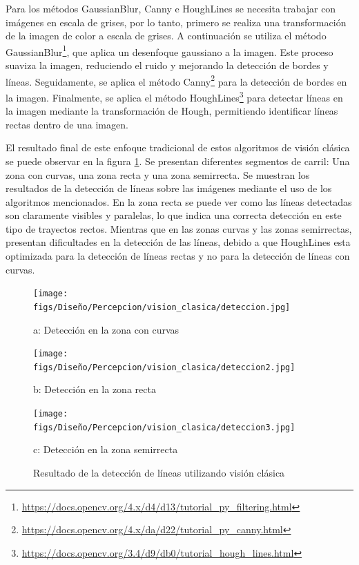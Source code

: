 Para los métodos GaussianBlur, Canny e HoughLines se necesita trabajar con imágenes en escala de grises, por lo tanto, primero se realiza una transformación de la imagen 
de color a escala de grises. A continuación se utiliza el método GaussianBlur\footnote{\url{https://docs.opencv.org/4.x/d4/d13/tutorial_py_filtering.html}}, que aplica un desenfoque 
gaussiano a la imagen. Este proceso suaviza la imagen, reduciendo el ruido y mejorando la detección de bordes y líneas. Seguidamente, se aplica el método Canny\footnote{\url{https://docs.opencv.org/4.x/da/d22/tutorial_py_canny.html}} 
para la detección de bordes en la imagen. Finalmente, se aplica el método HoughLines\footnote{\url{https://docs.opencv.org/3.4/d9/db0/tutorial_hough_lines.html}} 
para detectar líneas en la imagen mediante la transformación de Hough, permitiendo identificar líneas rectas dentro de una imagen. 

El resultado final de este enfoque tradicional de estos algoritmos de visión clásica se puede observar en la figura \ref{Vision_clasica}. Se presentan diferentes segmentos
de carril: Una zona con curvas, una zona recta y una zona semirrecta. Se muestran los resultados de la detección de líneas sobre las imágenes mediante el uso de los algoritmos mencionados. En la zona recta se puede ver como las líneas
detectadas son claramente visibles y paralelas, lo que indica una correcta detección en este tipo de trayectos rectos. Mientras que en las zonas curvas y las zonas semirrectas, presentan
dificultades en la detección de las líneas, debido a que HoughLines esta optimizada para la detección de líneas rectas y no para la detección de líneas con curvas. 

\begin{figure}[H]
  \begin{minipage}[t]{0.3\textwidth}
      \centering
      \texttt{[image: figs/Diseño/Percepcion/vision\_clasica/deteccion.jpg]}
      \caption*{a: Detección en la zona con curvas}
  \end{minipage}
  \hfill
  \begin{minipage}[t]{0.3\textwidth}
      \centering
      \texttt{[image: figs/Diseño/Percepcion/vision\_clasica/deteccion2.jpg]}
      \caption*{b: Detección en la zona recta}
  \end{minipage}
  \hfill
  \begin{minipage}[t]{0.3\textwidth}
      \centering
      \texttt{[image: figs/Diseño/Percepcion/vision\_clasica/deteccion3.jpg]}
      \caption*{c: Detección en la zona semirrecta}
  \end{minipage}
  \caption{Resultado de la detección de líneas utilizando visión clásica}
  \label{Vision_clasica}
  \vspace{-1.5em}
\end{figure}

